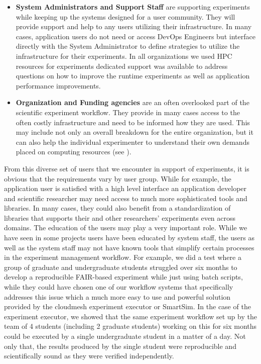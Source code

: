 \documentclass[utf8]{FrontiersinVancouver} %
\begin{document}
\begin{itemize}
    \item {\bf System Administrators and Support Staff} are supporting experiments while keeping up the systems designed for a user community. They will provide support and help to any users utilizing their infrastructure. In many cases, application users do not need or access DevOps Engineers but interface directly with the System Administrator to define strategies to utilize the infrastructure for their experiments. In all organizations we used HPC resources for experiments dedicated support was available to address questions on how to improve the runtime experiments as well as application performance improvements.
    \item {\bf Organization and Funding agencies} are an often overlooked part of the scientific experiment workflow. They provide in many cases access to the often costly infrastructure and need to be informed how they are used. This may include not only an overall breakdown for the entire organization, but it can also help the individual experimenter to understand their own demands placed on computing resources (see \citep{las-15-tas}). 
\end{itemize}

From this diverse set of users that we encounter in support of experiments, it is obvious that the requirements vary by user group. While for example, the application user is satisfied with a high level interface an application developer and scientific researcher may need access to much more sophisticated tools and libraries. In many cases, they could also benefit from a standardization of libraries that supports their and other researchers' experiments even across domains. The education of the users may play a very important role. While we have seen in some projects users have been educated by system staff, the users as well as the system staff may not have known tools that simplify certain processes in the experiment management workflow. For example, we did a test where a group of graduate and undergraduate students struggled over six months to develop a reproducible FAIR-based experiment while just using batch scripts, while they could have chosen one of our workflow systems that specifically addresses this issue which a much more easy to use and powerful solution provided by the cloudmesh experiment executor or SmartSim. In the case of the experiment executor, we showed that the same experiment workflow set up by the team of 4 students (including 2 graduate students) working on this for six months could be executed by a single undergraduate student in a matter of a day. Not only that, the results produced by the single student were reproducible and scientifically sound as they were verified independently.
\end{document}

